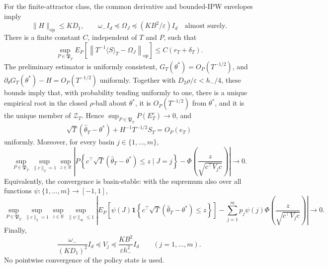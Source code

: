 For the finite-attractor class, the common derivative and bounded-IPW envelopes imply
\[
 \|H\|_{\mathrm{op}}\le KD_1,
 \qquad \omega_-I_d\preceq\Omega_J\preceq(KB^2/\varepsilon)I_d
 \quad\text{almost surely}.
\]
There is a finite constant \(C\), independent of \(T\) and \(P\), such that
\[
 \sup_{P\in\mathfrak P_T}E_P\!\left[\left\|T^{-1}\langle S\rangle_T-\Omega_J\right\|_{\mathrm{op}}\right]
 \le C(r_T+\delta_T).
\]
The preliminary estimator is uniformly consistent, \(G_T(\theta^*)=O_P(T^{-1/2})\), and \(\partial_\theta G_T(\theta^*)-H=O_P(T^{-1/2})\) uniformly. Together with \(D_2\rho/\varepsilon<h_-/4\), these bounds imply that, with probability tending uniformly to one, there is a unique empirical root in the closed \(\rho\)-ball about \(\theta^*\), it is \(O_P(T^{-1/2})\) from \(\theta^*\), and it is the unique member of \(\mathcal Z_T\). Hence \(\sup_{P\in\mathfrak P_T}P(E_T^c)\to0\), and
\[
 \sqrt T(\widehat\theta_T-\theta^*)+H^{-1}T^{-1/2}S_T=O_P(e_T)
\]
uniformly. Moreover, for every basin \(j\in\{1,\ldots,m\}\),
\[
 \sup_{P\in\mathfrak P_T}\sup_{\|c\|_2=1}\sup_{z\in\mathbb R}
 \left|P\!\left\{c^\top\sqrt T(\widehat\theta_T-\theta^*)\le z\mid J=j\right\}
 -\Phi\!\left(\frac{z}{\sqrt{c^\top V_jc}}\right)\right|\longrightarrow0.
\]
Equivalently, the convergence is basin-stable: with the supremum also over all functions \(\psi:\{1,\ldots,m\}\to[-1,1]\),
\[
 \sup_{P\in\mathfrak P_T}\sup_{\|c\|_2=1}\sup_{z\in\mathbb R}\sup_{\|\psi\|_\infty\le1}
 \left|E_P\!\left[\psi(J)\mathbf 1\!\left\{c^\top\sqrt T(\widehat\theta_T-\theta^*)\le z\right\}\right]
 -\sum_{j=1}^mp_j\psi(j)\Phi\!\left(\frac{z}{\sqrt{c^\top V_jc}}\right)\right|\longrightarrow0.
\]
Finally,
\[
 \frac{\omega_-}{(KD_1)^2}I_d\preceq V_j
 \preceq\frac{KB^2}{\varepsilon h_-^2}I_d
 \qquad(j=1,\ldots,m).
\]
No pointwise convergence of the policy state is used.
